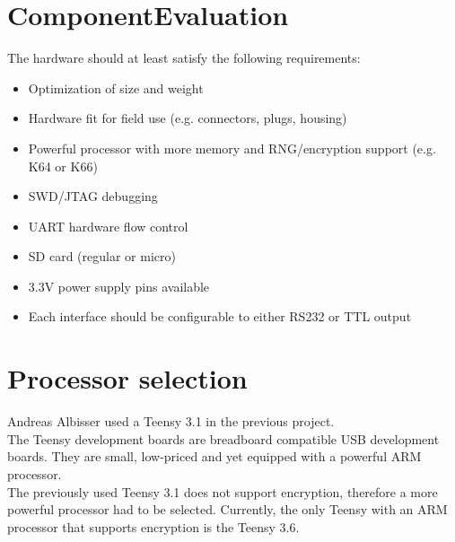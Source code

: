 \section*{ComponentEvaluation}
The hardware should at least satisfy the following requirements:

\begin{itemize}
	\item Optimization of size and weight \\
	\item Hardware fit for field use (e.g. connectors, plugs, housing) \\
	\item Powerful processor with more memory and RNG/encryption support (e.g. K64 or K66) \\
	\item SWD/JTAG debugging \\
	\item UART hardware flow control \\
	\item SD card (regular or micro) \\
	\item 3.3V power supply pins available \\
	\item Each interface should be configurable to either RS232 or TTL output \\
\end{itemize}

\section*{Processor selection}
Andreas Albisser used a Teensy 3.1 in the previous project.\\
The Teensy development boards are breadboard compatible USB development boards. They are small, low-priced and yet equipped with a powerful ARM processor.\\
The previously used Teensy 3.1 does not support encryption, therefore a more powerful processor had to be selected. Currently, the only Teensy with an ARM processor that supports encryption is the Teensy 3.6.


